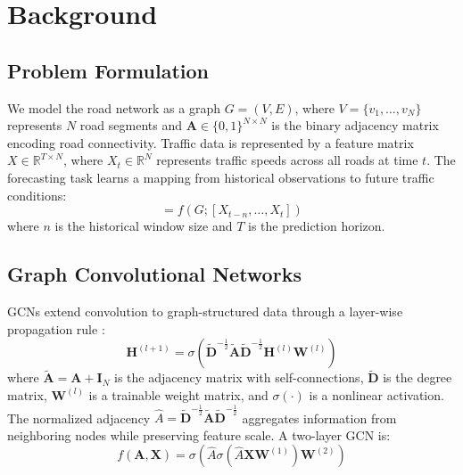 \section{Background}\label{sec:bg}

\subsection{Problem Formulation}

We model the road network as a graph $G=(V,E)$, where $V=\{v_1,\ldots,v_N\}$ represents $N$ road segments and $\mathbf{A} \in \{0,1\}^{N \times N}$ is the binary adjacency matrix encoding road connectivity. Traffic data is represented by a feature matrix $X \in \mathbb{R}^{T \times N}$, where $X_t \in \mathbb{R}^N$ represents traffic speeds across all roads at time $t$. The forecasting task learns a mapping from historical observations to future traffic conditions:
\begin{equation}
[X_{t+1},\ldots,X_{t+T}] = f(G;[X_{t-n},\ldots,X_t])
\end{equation}
where $n$ is the historical window size and $T$ is the prediction horizon.

\subsection{Graph Convolutional Networks}

GCNs extend convolution to graph-structured data through a layer-wise propagation rule \citep{kipf2017semi}:
\begin{equation}
\mathbf{H}^{(l+1)}= \sigma\!\left(\tilde{\mathbf{D}}^{-\frac{1}{2}} \tilde{\mathbf{A}}\tilde{\mathbf{D}}^{-\frac{1}{2}}\mathbf{H}^{(l)} \mathbf{W}^{(l)} \right)
\label{eq:gcn-layer}
\end{equation}
where $\tilde{\mathbf{A}} = \mathbf{A} + \mathbf{I}_N$ is the adjacency matrix with self-connections, $\tilde{\mathbf{D}}$ is the degree matrix, $\mathbf{W}^{(l)}$ is a trainable weight matrix, and $\sigma(\cdot)$ is a nonlinear activation. The normalized adjacency $\hat{A}=\tilde{\mathbf{D}}^{-\frac{1}{2}} \tilde{\mathbf{A}}\tilde{\mathbf{D}}^{-\frac{1}{2}}$ aggregates information from neighboring nodes while preserving feature scale. A two-layer GCN is:
\begin{equation}
f(\mathbf{A},\mathbf{X})=\sigma\!\left(\hat{A}\sigma\!\left(\hat{A}\mathbf{X} \mathbf{W}^{(1)} \right) \mathbf{W}^{(2)} \right)
\label{eq:two-layer-gcn}
\end{equation}

